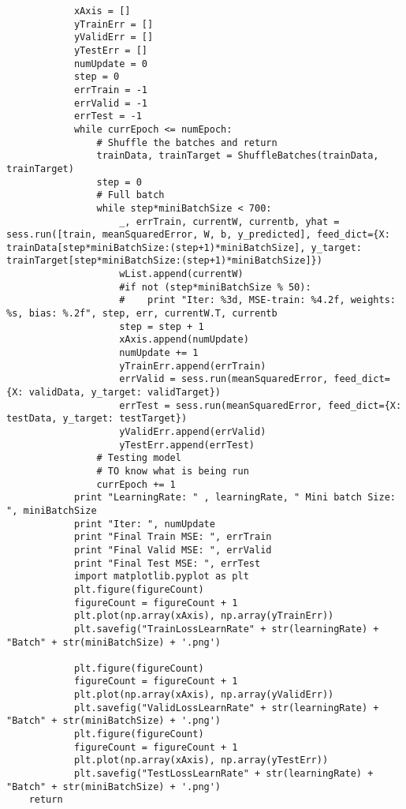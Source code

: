 \documentclass[a4paper,12pt]{article}
\begin{document}
\begin{verbatim}
            xAxis = []
            yTrainErr = []
            yValidErr = []
            yTestErr = []
            numUpdate = 0
            step = 0
            errTrain = -1 
            errValid = -1 
            errTest = -1 
            while currEpoch <= numEpoch:
                # Shuffle the batches and return
                trainData, trainTarget = ShuffleBatches(trainData, trainTarget)
                step = 0 
                # Full batch
                while step*miniBatchSize < 700:
                    _, errTrain, currentW, currentb, yhat = sess.run([train, meanSquaredError, W, b, y_predicted], feed_dict={X: trainData[step*miniBatchSize:(step+1)*miniBatchSize], y_target: trainTarget[step*miniBatchSize:(step+1)*miniBatchSize]})
                    wList.append(currentW)
                    #if not (step*miniBatchSize % 50):
                    #    print "Iter: %3d, MSE-train: %4.2f, weights: %s, bias: %.2f", step, err, currentW.T, currentb
                    step = step + 1
                    xAxis.append(numUpdate)
                    numUpdate += 1
                    yTrainErr.append(errTrain)
                    errValid = sess.run(meanSquaredError, feed_dict={X: validData, y_target: validTarget})
                    errTest = sess.run(meanSquaredError, feed_dict={X: testData, y_target: testTarget})
                    yValidErr.append(errValid)
                    yTestErr.append(errTest)
                # Testing model
                # TO know what is being run
                currEpoch += 1
            print "LearningRate: " , learningRate, " Mini batch Size: ", miniBatchSize
            print "Iter: ", numUpdate
            print "Final Train MSE: ", errTrain
            print "Final Valid MSE: ", errValid
            print "Final Test MSE: ", errTest
            import matplotlib.pyplot as plt
            plt.figure(figureCount)
            figureCount = figureCount + 1
            plt.plot(np.array(xAxis), np.array(yTrainErr))
            plt.savefig("TrainLossLearnRate" + str(learningRate) + "Batch" + str(miniBatchSize) + '.png')

            plt.figure(figureCount)
            figureCount = figureCount + 1
            plt.plot(np.array(xAxis), np.array(yValidErr))
            plt.savefig("ValidLossLearnRate" + str(learningRate) + "Batch" + str(miniBatchSize) + '.png')
            plt.figure(figureCount)
            figureCount = figureCount + 1
            plt.plot(np.array(xAxis), np.array(yTestErr))
            plt.savefig("TestLossLearnRate" + str(learningRate) + "Batch" + str(miniBatchSize) + '.png')
    return


\end{verbatim}
\end{document}
